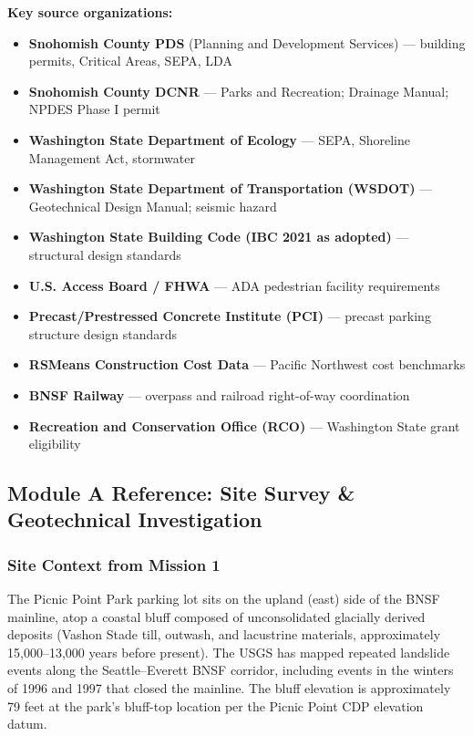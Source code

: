 \documentclass[11pt,letterpaper]{article}
\begin{document}
\textbf{Key source organizations:}
\begin{itemize}
  \item \textbf{Snohomish County PDS} (Planning and Development Services) --- building permits, Critical Areas, SEPA, LDA
  \item \textbf{Snohomish County DCNR} --- Parks and Recreation; Drainage Manual; NPDES Phase I permit
  \item \textbf{Washington State Department of Ecology} --- SEPA, Shoreline Management Act, stormwater
  \item \textbf{Washington State Department of Transportation (WSDOT)} --- Geotechnical Design Manual; seismic hazard
  \item \textbf{Washington State Building Code (IBC 2021 as adopted)} --- structural design standards
  \item \textbf{U.S. Access Board / FHWA} --- ADA pedestrian facility requirements
  \item \textbf{Precast/Prestressed Concrete Institute (PCI)} --- precast parking structure design standards
  \item \textbf{RSMeans Construction Cost Data} --- Pacific Northwest cost benchmarks
  \item \textbf{BNSF Railway} --- overpass and railroad right-of-way coordination
  \item \textbf{Recreation and Conservation Office (RCO)} --- Washington State grant eligibility
\end{itemize}

\subsection{Module A Reference: Site Survey \& Geotechnical Investigation}

\subsubsection{Site Context from Mission 1}

The Picnic Point Park parking lot sits on the upland (east) side of the BNSF mainline, atop a coastal bluff composed of unconsolidated glacially derived deposits (Vashon Stade till, outwash, and lacustrine materials, approximately 15,000--13,000 years before present). The USGS has mapped repeated landslide events along the Seattle--Everett BNSF corridor, including events in the winters of 1996 and 1997 that closed the mainline. The bluff elevation is approximately 79 feet at the park's bluff-top location per the Picnic Point CDP elevation datum.
\end{document}
